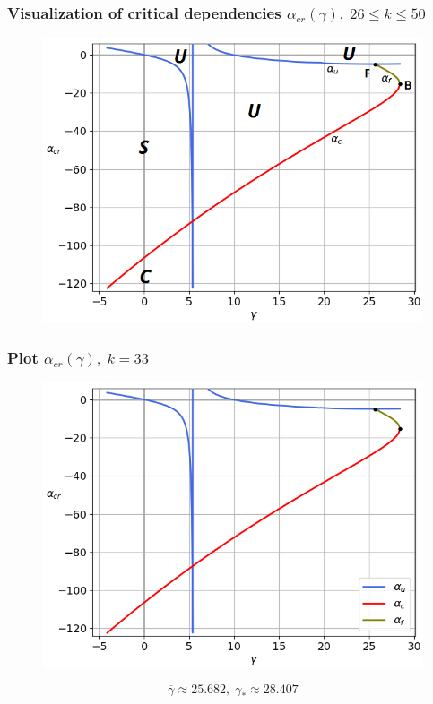 \documentclass[fullscreen=true, unicode, bookmarks=false]{beamer}
\begin{document}
\begin{frame}
\frametitle{ Visualization of critical dependencies $ \alpha_{cr}(\gamma), \; 26 \leqslant k \leqslant 50 $ }

\begin{figure} 
\includegraphics[scale=0.59]{scheme2650.png}  
\end{figure}

\end{frame}

\begin{frame}
\frametitle{ Plot $ \alpha_{cr}(\gamma), \; k = 33 $ }

\begin{figure} 
\includegraphics[scale=0.55]{alphas_067.png}  
\end{figure}
$$ \overline{\gamma} \approx 25.682, \; \gamma_* \approx 28.407 $$

\end{frame}
\end{document}
